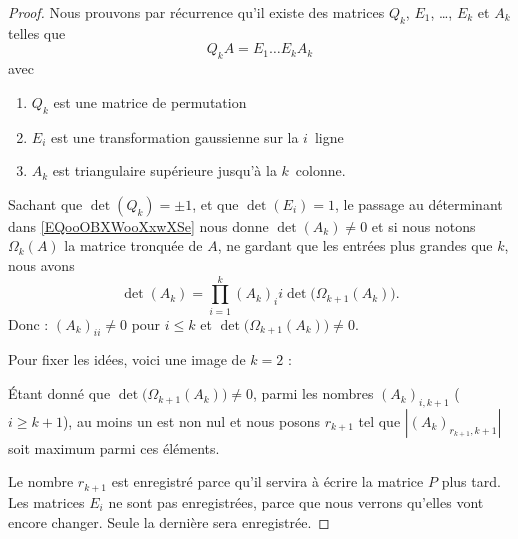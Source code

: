 \begin{proof}
	Nous prouvons par récurrence qu'il existe des matrices \( Q_k\), \( E_1\), \ldots, \( E_k\) et \( A_k\) telles que
	\begin{equation}        \label{EQooOBXWooXxwXSe}
		Q_kA=E_1\ldots E_kA_k
	\end{equation}
	avec
	\begin{enumerate}
		\item
		      \( Q_k\) est une matrice de permutation
		\item
		      \( E_i\) est une transformation gaussienne sur la \( i\)\ieme\ ligne
		\item
		      \( A_k\) est triangulaire supérieure jusqu'à la \( k\)\ieme\ colonne.
	\end{enumerate}

	Sachant que \( \det(Q_k)=\pm 1\), et que \( \det(E_i)=1\), le passage au déterminant dans \eqref{EQooOBXWooXxwXSe} nous donne \( \det(A_k)\neq 0\) et si nous notons \( \Omega_k(A)\) la matrice tronquée de \( A\), ne gardant que les entrées plus grandes que \( k\), nous avons
	\begin{equation}
		\det(A_k)=\prod_{i=1}^k(A_k)_ii\det\big( \Omega_{k+1}(A_k) \big).
	\end{equation}
	Donc  : \( (A_k)_{ii}\neq 0\) pour \( i\leq k\) et \( \det\big( \Omega_{k+1}(A_k) \big)\neq 0\).

	Pour fixer les idées, voici une image de \( k=2\) :
	\begin{equation}
		
	\end{equation}

	Étant donné que \( \det\big( \Omega_{k+1}(A_k) \big)\neq 0\), parmi les nombres \( (A_k)_{i,k+1}\) (\( i\geq k+1\)), au moins un est non nul et nous posons \( r_{k+1}\) tel que \( | (A_k)_{r_{k+1},k+1} | \) soit maximum parmi ces éléments.

	Le nombre \( r_{k+1}\) est enregistré parce qu'il servira à écrire la matrice \( P\) plus tard. Les matrices \( E_i\) ne sont pas enregistrées, parce que nous verrons qu'elles vont encore changer. Seule la dernière sera enregistrée.


\end{proof}

